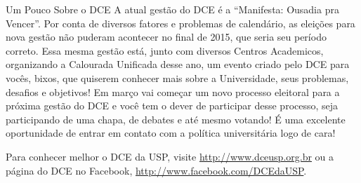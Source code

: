 \begin{secao}{Um Pouco Sobre o DCE}
A atual gestão do DCE é a “Manifesta: Ousadia pra Vencer”. Por conta de diversos fatores e problemas de calendário, as eleições para nova gestão não puderam acontecer no final de 2015, que seria seu período correto. Essa mesma gestão está, junto com diversos Centros Academicos, organizando a Calourada Unificada desse ano, um evento criado pelo DCE para vocês, bixos, que quiserem conhecer mais sobre a Universidade, seus problemas, desafios e objetivos! Em março vai começar um novo processo eleitoral para a próxima gestão do DCE e você tem o dever de participar desse processo, seja participando de uma chapa, de debates e até mesmo votando! É uma excelente oportunidade de entrar em contato com a política universitária logo de cara!

Para conhecer melhor o DCE da USP, visite \url{http://www.dceusp.org.br} ou a página do DCE no Facebook,
\url{http://www.facebook.com/DCEdaUSP}.

\end{secao}
